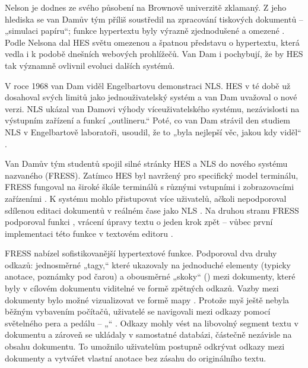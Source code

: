 Nelson je dodnes ze svého působení na Brownově univerzitě zklamaný. Z jeho hlediska se van Damův tým příliš soustředil na zpracování tiskových dokumentů -- „simulaci papíru“; funkce hypertextu byly výrazně zjednodušené a omezené \autocite[100]{Barnet2014}. Podle Nelsona dal HES světu omezenou a špatnou představu o hypertextu, která vedla i k podobě dnešních webových prohlížečů. Van Dam i \textcite[107]{Barnet2014} pochybují, že by HES tak významně ovlivnil evoluci dalších systémů.



V roce 1968 van Dam viděl Engelbartovu demonstraci NLS. HES v té době už dosahoval svých limitů jako jednouživatelský systém a van Dam uvažoval o nové verzi. NLS ukázal van Damovi výhody víceuživatelského systému, nezávislosti na výstupním zařízení a funkcí „outlineru.“ \autocites[890]{vanDam1988}[61]{Barnet2014} Poté, co van Dam strávil den studiem NLS v Engelbartově laboratoři, usoudil, že to „byla nejlepší věc, jakou kdy viděl“ \autocite[158]{Markoff2005}.

Van Damův tým studentů spojil silné stránky HES a NLS do nového systému nazvaného  (FRESS). Zatímco HES byl navržený pro specifický model terminálu, FRESS fungoval na široké škále terminálů s různými vstupními i zobrazovacími zařízeními \autocites[218]{Wright2007}[108]{Barnet2014}. K systému mohlo přistupovat více uživatelů, ačkoli nepodporoval sdílenou editaci dokumentů v reálném čase jako NLS \autocite[108]{Barnet2014}. Na druhou stranu FRESS podporoval funkci , vrácení úpravy textu o jeden krok zpět -- vůbec první implementaci této funkce v textovém editoru \autocites[891]{vanDam1988}[108]{Barnet2014}.

FRESS nabízel sofistikovanější hypertextové funkce. Podporoval dva druhy odkazů: jednosměrné „tagy,“ které ukazovaly na jednoduché elementy (typicky anotace, poznámky pod čarou) a obousměrné „skoky“ () mezi dokumenty, které byly v cílovém dokumentu viditelné ve formě zpětných odkazů. Vazby mezi dokumenty bylo možné vizualizovat ve formě mapy \autocite[109]{Barnet2014}. Protože myš ještě nebyla běžným vybavením počítačů, uživatelé se navigovali mezi odkazy pomocí světelného pera a pedálu -- „“ \autocites[19]{Muller-Prove2002}[218]{Wright2007}. Odkazy mohly vést na libovolný segment textu v dokumentu \autocite[109]{Barnet2014} a zároveň se ukládaly v samostatné databázi, částečně nezávisle na obsahu dokumentu. To umožnilo uživatelům postupně odkrývat odkazy mezi dokumenty a vytvářet vlastní anotace bez zásahu do originálního textu.

